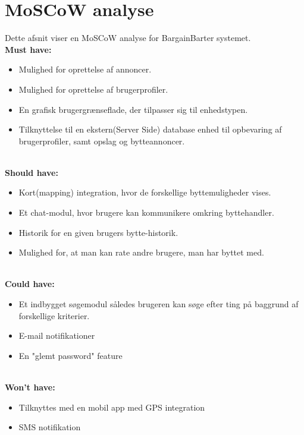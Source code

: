 \chapter{MoSCoW analyse}
Dette afsnit viser en MoSCoW analyse for BargainBarter systemet. \\
\textbf{Must have:}
\begin{itemize}[noitemsep]
	\item Mulighed for oprettelse af annoncer.
	\item Mulighed for oprettelse af brugerprofiler.
	\item En grafisk brugergrænseflade, der tilpasser sig til enhedstypen.
	\item Tilknyttelse til en ekstern(Server Side) database enhed til opbevaring af brugerprofiler, samt opslag og bytteannoncer.
	
\end{itemize}

\textbf{\\Should have:}
\begin{itemize}[noitemsep]
	\item Kort(mapping) integration, hvor de forskellige byttemuligheder vises.
	\item Et chat-modul, hvor brugere kan kommunikere omkring byttehandler.
	\item Historik for en given brugers bytte-historik.
	\item Mulighed for, at man kan rate andre brugere, man har byttet med.
\end{itemize}

\textbf{\\Could have:}
\begin{itemize}[noitemsep]
	\item Et indbygget søgemodul således brugeren kan søge efter ting på baggrund af forskellige kriterier.
	\item E-mail notifikationer
	\item En "glemt password" feature
\end{itemize}

\textbf{\\Won't have:}
\begin{itemize}[noitemsep]
	\item Tilknyttes med en mobil app med GPS integration
	\item SMS notifikation 
\end{itemize}
